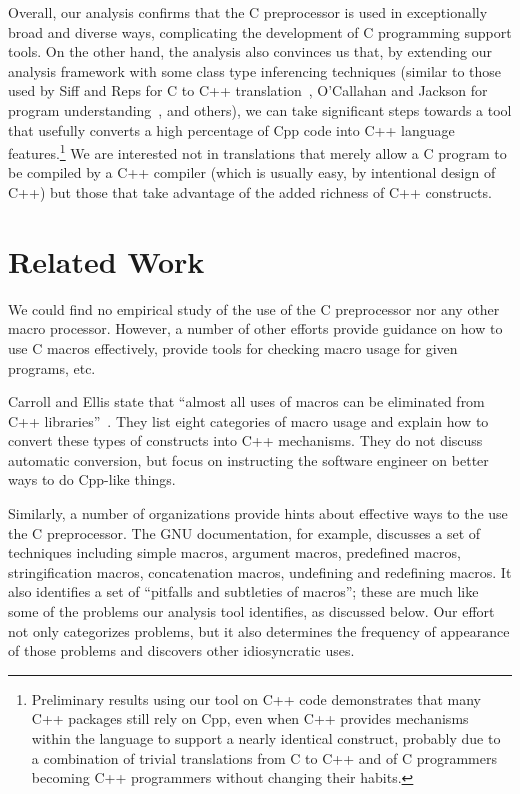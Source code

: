 Overall, our analysis confirms that the C preprocessor is used in
exceptionally broad and diverse ways, complicating the development of
C programming support tools.  On the other hand, the analysis also
convinces us that, by extending our analysis framework with some class
type inferencing techniques (similar to those used by Siff and Reps
for C to C++ translation~\cite{Siff-fse96}, O'Callahan and Jackson for
program understanding~\cite{OCallahan-icse97}, and others), we can
take significant steps towards a tool that usefully converts a high
percentage of Cpp code into C++ language
features.\footnote{Preliminary results using our tool on C++ code
demonstrates that many C++ packages still rely on Cpp, even when C++
provides mechanisms within the language to support a nearly identical
construct, probably due to a combination of trivial
translations from C to C++ and of C programmers becoming C++
programmers without changing their habits.}  We are
interested not in translations that merely allow a C program to be
compiled by a C++ compiler (which is usually easy, by intentional
design of C++) but those that take advantage of the added richness of C++
constructs.


\section{Related Work}\label{sec:related}

We could find no empirical study of the use of the C preprocessor nor
any other macro processor.  However, a number of other efforts provide
guidance on how to use C macros effectively, provide tools for
checking macro usage for given programs, etc.

Carroll and Ellis state that ``almost all uses of macros can be
eliminated from C++ libraries''~\cite[p.146]{Carroll95}. 
They list eight categories of macro usage and explain how to convert
these types of constructs into C++ mechanisms.  They do not
discuss automatic conversion, but  focus on instructing the
software engineer on better ways to do Cpp-like things.

Similarly, a number of organizations provide hints about effective
ways to the use the C preprocessor.  The GNU documentation, for example,
discusses a set of techniques including simple macros, argument
macros, predefined macros, stringification macros, concatenation
macros, undefining and redefining
macros.
It also identifies a set of ``pitfalls and subtleties of
macros''; these are much like some of the problems our analysis tool
identifies, as discussed below.  Our effort not only categorizes
problems, but it also determines the frequency of appearance of those
problems and discovers other idiosyncratic uses.

